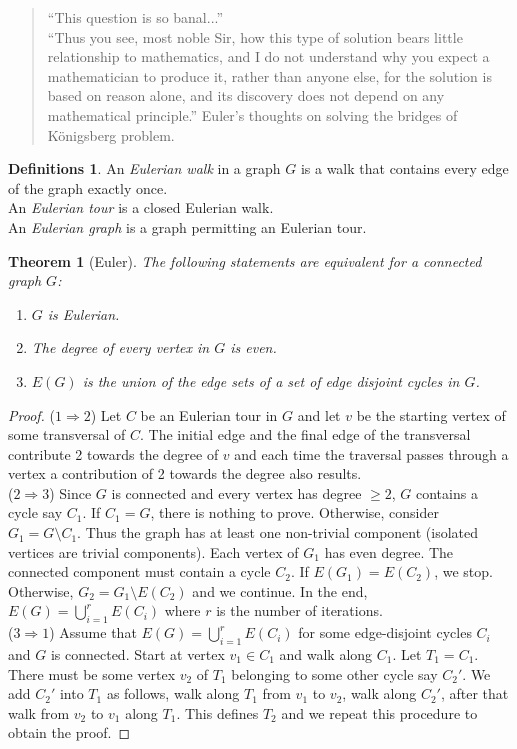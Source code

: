 \documentclass{article}
\newtheorem*{thm}{Theorem}
\theoremstyle{definition}
\newtheorem*{defns}{Definitions}
\begin{document}
\begin{quotation}
``This question is so banal...'' \\
``Thus you see, most noble Sir, how this type of solution bears little relationship to mathematics, and I do not understand why you expect a     mathematician to produce it, rather than anyone else, for the solution is based on reason alone, and its discovery does not depend on any mathematical principle.'' Euler's thoughts on solving the bridges of K\"onigsberg problem.
\end{quotation}

\begin{defns}
An \emph{Eulerian walk} in a graph $G$ is a walk that contains every edge of the graph exactly once. \\
An \emph{Eulerian tour} is a closed Eulerian walk. \\
An \emph{Eulerian graph} is a graph permitting an Eulerian tour. \\
\end{defns}

\begin{thm}[Euler]
The following statements are equivalent for a connected graph $G$:
\begin{enumerate}
\item $G$ is Eulerian.
\item The degree of every vertex in $G$ is even.
\item $E(G)$ is the union of the edge sets of a set of edge disjoint cycles in $G$.
\end{enumerate}
\end{thm}

\begin{proof}
($1\Rightarrow 2$) Let $C$ be an Eulerian tour in $G$ and let $v$ be the starting vertex of some transversal of $C$.
The initial edge and the final edge of the transversal contribute 2 towards the degree of $v$ and each time the traversal passes through a vertex a contribution of 2 towards the degree also results. \\
($2\Rightarrow 3$) Since $G$ is connected and every vertex has degree $\ge 2$, $G$ contains a cycle say $C_1$.
If $C_1 = G$, there is nothing to prove.
Otherwise, consider $G_1=G\setminus C_1$.
Thus the graph has at least one non-trivial component (isolated vertices are trivial components).
Each vertex of $G_1$ has even degree.
The connected component must contain a cycle $C_2$.
If $E(G_1) = E(C_2)$, we stop.
Otherwise, $G_2 = G_1\setminus E(C_2)$ and we continue.
In the end, $E(G) = \bigcup_{i=1}^r E(C_i)$ where $r$ is the number of iterations. \\
($3\Rightarrow 1$) Assume that $E(G) = \bigcup_{i=1}^r E(C_i)$ for some edge-disjoint cycles $C_i$ and $G$ is connected.
Start at vertex $v_1\in C_1$ and walk along $C_1$.
Let $T_1 = C_1$.
There must be some vertex $v_2$ of $T_1$ belonging to some other cycle say $C_2'$.
We add $C_2'$ into $T_1$ as follows, walk along $T_1$ from $v_1$ to $v_2$, walk along $C_2'$, after that walk from $v_2$ to $v_1$ along $T_1$.
This defines $T_2$ and we repeat this procedure to obtain the proof.
\end{proof}
\end{document}
